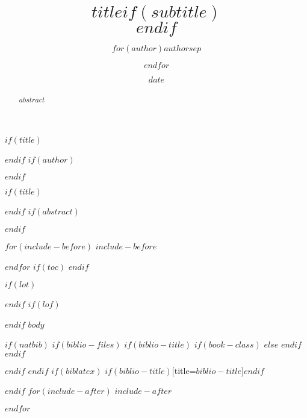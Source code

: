 \documentclass[$if(fontsize)$$fontsize$,$endif$$if(lang_babel)$$lang_babel$,$endif$$if(papersize)$$papersize$,$endif$$for(classoption)$$classoption$$sep$,$endfor$]{$documentclass$}
\begin{document}
\pagestyle{empty}%
$if(title)$
\title{$title$$if(subtitle)$\\\vspace{0.5em}{\large $subtitle$}$endif$}
$endif$
$if(author)$
\author{$for(author)$$author$$sep$ \and $endfor$}
$endif$
\date{$date$}

$if(title)$
\maketitle\thispagestyle{empty}
$endif$
$if(abstract)$
\begin{abstract}
$abstract$
\end{abstract}
$endif$

\pagestyle{fancy}                   %
\fancyhf{}                          %
\fancyhead[ER,OR]{\leftmark}        %

\renewcommand{\sectionmark}[1]{
    \markboth{\thesection{} #1}{}
}

$for(include-before)$
$include-before$

$endfor$
$if(toc)$
{
\hypersetup{linkcolor=black}
\setcounter{tocdepth}{$toc-depth$}
\tableofcontents
}
$endif$

$if(lot)$
\listoftables
$endif$
$if(lof)$
\listoffigures
$endif$
$body$

$if(natbib)$
$if(biblio-files)$
$if(biblio-title)$
$if(book-class)$
\renewcommand\bibname{$biblio-title$}
$else$
\renewcommand\refname{$biblio-title$}
$endif$
$endif$


$endif$
$endif$
$if(biblatex)$
\printbibliography$if(biblio-title)$[title=$biblio-title$]$endif$

$endif$
$for(include-after)$
$include-after$

$endfor$
\end{document}
